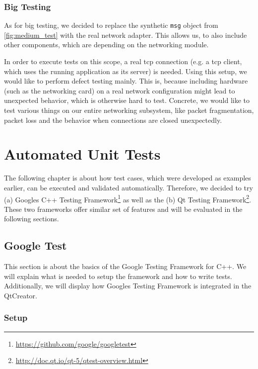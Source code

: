 \documentclass{scrreprt}
\begin{document}
\subsubsection{Big Testing}

As for big testing, we decided to replace the synthetic \texttt{msg} object from \vref{fig:medium_test} with the real network adapter. This allows us, to also include other components, which are depending on the networking module.

In order to execute tests on this scope, a real tcp connection (e.g. a tcp client, which uses the running application as its server) is needed. Using this setup, we would like to perform defect testing mainly. This is, because including hardware (such as the networking card) on a real network configuration might lead to unexpected behavior, which is otherwise hard to test. Concrete, we would like to test various things on our entire networking subsystem, like packet fragmentation, packet loss and the behavior when connections are closed unexpectedly.

\section{Automated Unit Tests}


The following chapter is about how test cases, which were developed as examples earlier, can be executed and validated automatically. Therefore, we decided to try (a) Googles C++ Testing Framework\footnote{\url{https://github.com/google/googletest}} as well as the (b) Qt Testing Framework\footnote{\url{http://doc.qt.io/qt-5/qtest-overview.html}}. These two frameworks offer similar set of features and will be evaluated in the following sections.

\subsection{Google Test}

This section is about the basics of the Google Testing Framework for C++. We will explain what is needed to setup the framework and how to write tests. Additionally, we will display how Googles Testing Framework is integrated in the QtCreator.

\subsubsection{Setup}
\end{document}
